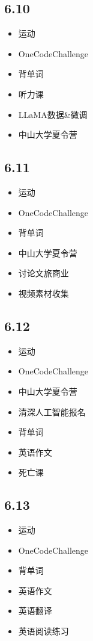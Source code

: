 \documentclass[UTF8]{ctexart}
\begin{document}
\subsection*{6.10}
\begin{itemize}
    \item 运动
    \item OneCodeChallenge
    \item 背单词
    \item 听力课
    \item LLaMA数据&微调
    \item 中山大学夏令营
\end{itemize}

\subsection*{6.11}
\begin{itemize}
    \item 运动
    \item OneCodeChallenge
    \item 背单词
    \item 中山大学夏令营
    \item 讨论文旅商业
    \item 视频素材收集
\end{itemize}

\subsection*{6.12}
\begin{itemize}
    \item 运动
    \item OneCodeChallenge
    \item 中山大学夏令营
    \item 清深人工智能报名
    \item 背单词
    \item 英语作文
    \item 死亡课
\end{itemize}

\subsection*{6.13}
\begin{itemize}
    \item 运动
    \item OneCodeChallenge
    \item 背单词
    \item 英语作文
    \item 英语翻译
    \item 英语阅读练习
\end{itemize}
\end{document}

